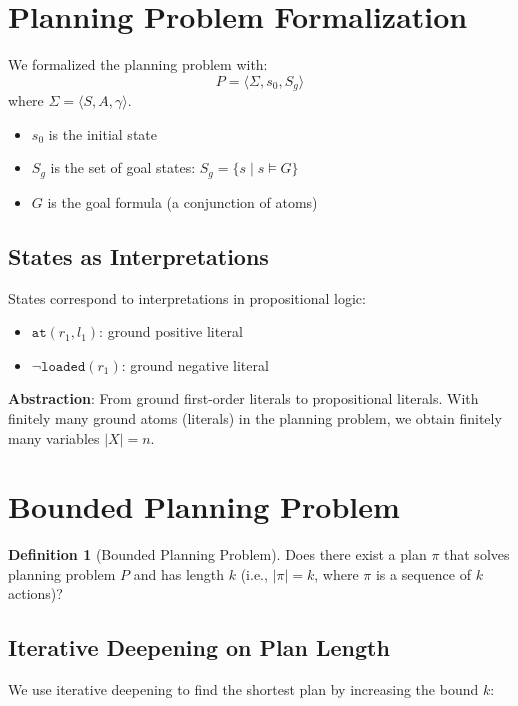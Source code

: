 \documentclass[11pt,a4paper]{article}
\theoremstyle{definition}
\newtheorem{definition}{Definition}[section]
\theoremstyle{plain}
\theoremstyle{remark}
\begin{document}
\section{Planning Problem Formalization}

We formalized the planning problem with:
\[
P = \langle \Sigma, s_0, S_g \rangle
\]
where $\Sigma = \langle S, A, \gamma \rangle$.

\begin{itemize}
    \item $s_0$ is the initial state
    \item $S_g$ is the set of goal states: $S_g = \{s \mid s \models G\}$
    \item $G$ is the goal formula (a conjunction of atoms)
\end{itemize}

\subsection{States as Interpretations}

States correspond to interpretations in propositional logic:

\begin{itemize}
    \item $\texttt{at}(r_1, l_1)$: ground positive literal
    \item $\neg \texttt{loaded}(r_1)$: ground negative literal
\end{itemize}

\textbf{Abstraction}: From ground first-order literals to propositional literals. With finitely many ground atoms (literals) in the planning problem, we obtain finitely many variables $|X| = n$.

\section{Bounded Planning Problem}

\begin{definition}[Bounded Planning Problem]
Does there exist a plan $\pi$ that solves planning problem $P$ and has length $k$ (i.e., $|\pi| = k$, where $\pi$ is a sequence of $k$ actions)?
\end{definition}

\subsection{Iterative Deepening on Plan Length}

We use iterative deepening to find the shortest plan by increasing the bound $k$:
\end{document}
